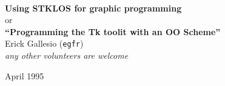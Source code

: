 \documentclass[10pt]{report}
\begin{document}
%
% 

\newcommand{\stk}{{\sc STk}}
\newcommand{\stklos}{{\sc STklos}}
\newcommand{\Indextt}[1]{{\tt{#1}}\index{#1}}
\newcommand{\Index}[1]{{#1}\index{#1}}


\newcommand{\schemetitle}[2]{%
\begin{center}
\vskip2mm
\Ovalbox{\parbox{0.95\textwidth}{%
\vskip1mm~~{\tt\LARGE{#1}\index{#1}}\hfill{\tt{#2}}~~\vskip1mm}}
\vskip2mm
\end{center}}


\newcommand{\ITEM}[1]{\item[{\bf{#1}}]\index{#1}\item[]}

%
%
\newenvironment{schemedoc}[1]{\vskip0mm\noindent{\em #1}
\begin{list} {} {\setlength {\rightmargin}{0cm}\setlength {\leftmargin}
{1cm}\setlength {\topsep} {0cm}\setlength {\partopsep} {0cm}
\setlength {\parskip} {0cm}\item}}{\end{list}}

\newenvironment{ip}{\noindent
\begin{list} {} {\setlength {\rightmargin}{0cm}
\setlength {\leftmargin}{2cm}
\setlength {\topsep} {0cm}
\setlength {\labelsep} {0cm}
\setlength {\listparindent} {0cm}
\setlength {\partopsep} {0cm}
\setlength {\parskip} {0cm}
\item}}{\end{list}\vskip3mm}


%
%
\thispagestyle{empty}
\begin{center}   
\ \\[3cm]
{\huge\bf Using ST{\large\bf{KLOS}} for graphic programming}\\[3mm]
{\large or}\\[4mm]
{\large\bf{``Programming the Tk toolit with an OO Scheme''}}\\[3cm]
{\large Erick Gallesio ({\tt eg\@unice\.fr})}\\
{\large\em any other volunteers are welcome}
\end{center}
\vskip10cm
\begin{flushright}
April 1995
\end{flushright}
%
%
\tableofcontents
\end{document}
